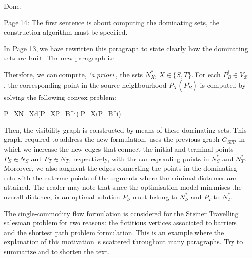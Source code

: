 \documentclass{article}
\newenvironment{reviewer}{\setcounter{pointcounter}{1}}{}
\newcommand{\point}{\text{{\selectfont \thepointcounter} \stepcounter{pointcounter}}}
\begin{document}
\begin{reviewer}
		\begin{tcolorbox}[breakable,enhanced,coltitle=black,colback=red!5!white,colframe=red!75!black,title=\textbf{Answer R1.\point},borderline={1pt}{0pt}{black},boxrule=0pt]
			Done.
		\end{tcolorbox}
		
		\begin{itshape}
			Page 14: The first sentence is about computing the dominating sets, the construction algorithm must be specified.
		\end{itshape}
		
		\begin{tcolorbox}[breakable,enhanced,coltitle=black,colback=red!5!white,colframe=red!75!black,title=\textbf{Answer R1.\point},borderline={1pt}{0pt}{black},boxrule=0pt]
		In Page 13, we have rewritten this paragraph to state clearly how the dominating sets are built. The new paragraph is:
		
		\medskip
		
		Therefore, we can compute, \textit{`a priori'},  the sets $N_X^*$, $X\in\{S,T\}$. For each $P_B^i\in V_{\mathcal B}$, the corresponding point in the source neighbourhood $P_X(P_B^i)$ is computed by solving the following convex problem:
		\begin{argmini*}
			{P_X\in N_X}{d(P_XP_B^i)}
			{}{P_X(P_B^i)=}\label{eq:computing_n}
		\end{argmini*}
		
		Then, the visibility graph is constructed by means of these dominating sets.
		This graph, required to address the new formulation, uses the previous graph $G_{\text{SPP}}$ in which we increase the new edges that connect the initial and terminal points $P_S\in N_S$ and $P_T\in N_T$, respectively, with the corresponding points in $N_S^*$ and $N_T^*$. Moreover, we also augment the edges connecting the points in the dominating sets with the extreme points of the segments where the minimal distances are attained. The reader may note that since the optimisation model minimises the overall distance, in an optimal solution $P_S$ must belong to $N_S^*$ and $P_T$ to $N_T^*$.
			

		\end{tcolorbox}
		
		\begin{itshape}
			The single-commodity flow formulation is considered for the Steiner Travelling salesman
			problem for two reasons: the fictitious vertices associated to barriers and the shortest path
			problem formulation. This is an example where the explanation of this motivation is scattered
			throughout many paragraphs. Try to summarize and to shorten the text.
		\end{itshape}
		

\end{reviewer}
\end{document}

